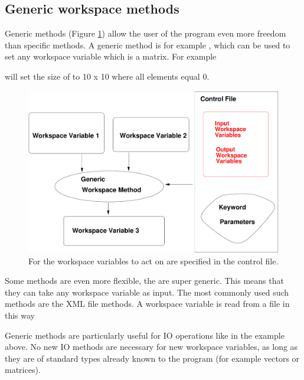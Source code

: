 \subsection{Generic workspace methods}

Generic methods (Figure \ref{fig:generic_method}) allow the user of
the program even more freedom than specific methods. A generic method
is for example , which can be used to set any
workspace variable which is a matrix. For example
\begin{quote}
\end{quote}
will set the size of  to 10 x 10 where all
elements equal 0.

\begin{figure}
  \begin{center}
    \includegraphics[width=\hsize,draft=false]{generic_method}
    \caption{For  the workspace
      variables to act on are specified in the control file.}
    \label{fig:generic_method}
  \end{center}
\end{figure}

Some methods are even more flexible, the are super generic. This means
that they can take any workspace variable as input. The most commonly
used such methods are the XML file methods. A workspace variable is
read from a file in this way
\begin{quote}
\end{quote}
Generic methods are particularly useful for IO operations like in the
example above. No new IO methods are necessary for new workspace
variables, as long as they are of standard types already known to the
program (for example vectors or matrices). 



